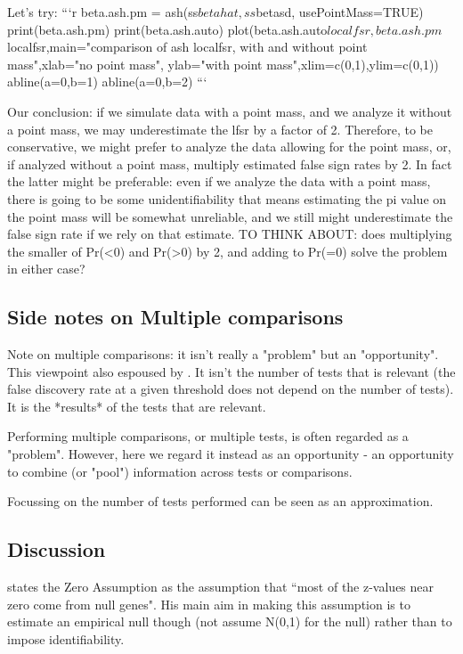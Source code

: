 \documentclass[11pt]{article}
\begin{document}
Let's try: 
```{r}
beta.ash.pm = ash(ss$betahat, ss$betasd, usePointMass=TRUE)
print(beta.ash.pm)
print(beta.ash.auto)
plot(beta.ash.auto$localfsr,beta.ash.pm$localfsr,main="comparison of ash localfsr, with and without point mass",xlab="no point mass", ylab="with point mass",xlim=c(0,1),ylim=c(0,1))
abline(a=0,b=1)
abline(a=0,b=2)
```

Our conclusion: if we simulate data with a point mass,
and we analyze it without a point mass, we may underestimate
the lfsr by a factor of 2. Therefore, to be conservative, we might prefer to analyze the data allowing for the point mass, or, if analyzed without a point mass, multiply estimated false sign rates by 2. In fact the latter might be preferable: even if we analyze the data with a point mass, there is going to be some unidentifiability
that means estimating the pi value on the point mass will be somewhat unreliable, and we still might underestimate the false sign rate if we rely on that estimate.  
TO THINK ABOUT: does multiplying the smaller of Pr(<0) and Pr(>0) by 2, and adding to Pr(=0) solve the problem in either case?


\subsection{Side notes on Multiple comparisons}

Note on multiple comparisons: it isn't really a "problem" but an "opportunity". This viewpoint also espoused by \cite{greenland1991empirical}. It isn't the number of tests that is relevant (the false
discovery rate at a given threshold does not depend on the number of tests). It is the *results* of the tests that are relevant.

Performing multiple comparisons, or multiple tests, is often
regarded as a "problem". However, here we regard it instead as an opportunity - an opportunity to combine (or "pool") information across tests or comparisons.

Focussing on the number of tests performed can be
seen as an approximation. 


\subsection{Discussion}

\cite{efron2008microarrays} states the Zero Assumption as the assumption that ``most of the z-values near zero come from null genes".
His main aim in making this assumption is to estimate an empirical null though (not assume N(0,1) for the null)
rather than to impose identifiability.
\end{document}
